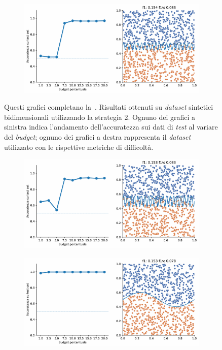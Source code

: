 \begin{appendices}
\begin{figure}[ht]
\begin{subfigure}{.8\textwidth}
    \end{subfigure}%
    \hfill
    \begin{subfigure}{.8\textwidth}
        \centering
        \includegraphics[width=\textwidth]{img/2d_v2/8.pdf}
    \end{subfigure}%
    \caption[]{Questi grafici completano la~. Risultati ottenuti su \emph{dataset} sintetici bidimensionali utilizzando la strategia 2. Ognuno dei grafici a sinistra indica l'andamento dell'accuratezza sui dati di \emph{test} al variare del \emph{budget}; ognuno dei grafici a destra rappresenta il \emph{dataset} utilizzato con le rispettive metriche di difficoltà.}
\end{figure}
\begin{figure}[ht]\ContinuedFloat
    \centering
    \begin{subfigure}{.8\textwidth}
        \centering
        \includegraphics[width=\textwidth]{img/2d_v2/9.pdf}
    \end{subfigure}
    \hfill
    \begin{subfigure}{.8\textwidth}
        \centering
        \includegraphics[width=\textwidth]{img/2d_v2/10.pdf}

\end{subfigure}
\end{figure}
\end{appendices}
